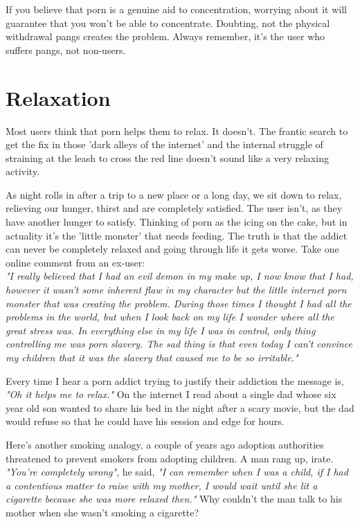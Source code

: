 \documentclass[easypeasy.tex]{subfiles}
\begin{document}
If you believe that porn is a genuine aid to concentration, worrying about it will guarantee that you won't be able to concentrate. Doubting, not the physical withdrawal pangs creates the problem. Always remember, it's the user who suffers pangs, not non-users.

\section{Relaxation}

Most users think that porn helps them to relax. It doesn't. The frantic search to get the fix in those 'dark alleys of the internet' and the internal struggle of straining at the leash to cross the red line doesn't sound like a very relaxing activity.

As night rolls in after a trip to a new place or a long day, we sit down to relax, relieving our hunger, thirst and are completely satisfied. The user isn't, as they have another hunger to satisfy. Thinking of porn as the icing on the cake, but in actuality it's the 'little monster' that needs feeding. The truth is that the addict can never be completely relaxed and going through life it gets worse. Take one online comment from an ex-user: \\
  \textit{"I really believed that I had an evil demon in my make up, I now know that I had, however it wasn't some inherent flaw in my character but the little internet porn monster that was creating the problem. During those times I thought I had all the problems in the world, but when I look back on my life I wonder where all the great stress was. In everything else in my life I was in control, only thing controlling me was porn slavery. The sad thing is that even today I can't convince my children that it was the slavery that caused me to be so irritable."}

Every time I hear a porn addict trying to justify their addiction the message is, \textit{"Oh it helps me to relax."} On the internet I read about a single dad whose six year old son wanted to share his bed in the night after a scary movie, but the dad would refuse so that he could have his session and edge for hours.

Here's another smoking analogy, a couple of years ago adoption authorities threatened to prevent smokers from adopting children. A man rang up, irate. \textit{"You're completely wrong"}, he said, \textit{"I can remember when I was a child, if I had a contentious matter to raise with my mother, I would wait until she lit a cigarette because she was more relaxed then."} Why couldn't the man talk to his mother when she wasn't smoking a cigarette?
\end{document}
